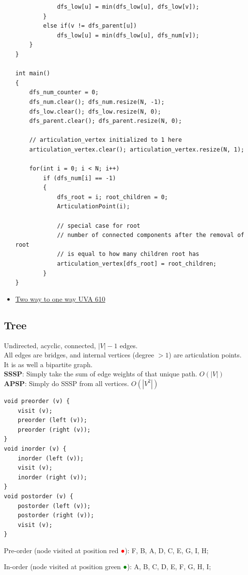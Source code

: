 \documentclass[8pt, a4paper, oneside, twocolumn]{extarticle}
\begin{document}
\begin{itemize}
\begin{verbatim}
            dfs_low[u] = min(dfs_low[u], dfs_low[v]);
        }
        else if(v != dfs_parent[u])
            dfs_low[u] = min(dfs_low[u], dfs_num[v]);
    }
}

int main() 
{
    dfs_num_counter = 0;
    dfs_num.clear(); dfs_num.resize(N, -1);
    dfs_low.clear(); dfs_low.resize(N, 0);
    dfs_parent.clear(); dfs_parent.resize(N, 0);
    
    // articulation_vertex initialized to 1 here
    articulation_vertex.clear(); articulation_vertex.resize(N, 1);

    for(int i = 0; i < N; i++)
        if (dfs_num[i] == -1)
        {
            dfs_root = i; root_children = 0;
            ArticulationPoint(i);
            
            // special case for root
            // number of connected components after the removal of root
            // is equal to how many children root has
            articulation_vertex[dfs_root] = root_children;
        }
}
    \end{verbatim}
    \item \href{https://gist.github.com/sourabhxyz/01c2bdf3f7389c2b84d40db5cce506f9}{Two way to one way UVA 610}
\end{itemize}
\subsection{Tree}
Undirected, acyclic, connected, $|V| - 1$ edges.\\
All edges are bridges, and internal vertices (degree $> 1$) are articulation points.\\
It is as well a bipartite graph.\\
\textbf{SSSP}: Simply take the sum of edge weights of that unique path. $O(|V|)$\\
\textbf{APSP}: Simply do SSSP from all vertices. $O(|V^2|)$
\begin{verbatim}
void preorder (v) {
	visit (v);
	preorder (left (v));
	preorder (right (v));
}
void inorder (v) {
	inorder (left (v));
	visit (v);
	inorder (right (v));
}
void postorder (v) {
	postorder (left (v));
	postorder (right (v));
	visit (v);
}
\end{verbatim}
 

Pre-order (node visited at position red \textcolor{red}{●}): F, B, A, D, C, E, G, I, H;

In-order (node visited at position green \textcolor{green}{●}): A, B, C, D, E, F, G, H, I;
\end{document}
